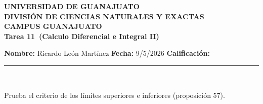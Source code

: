 \documentclass[12pt,a4paper]{article}
\newcommand{\alumno}{Ricardo León Martínez}
\newcommand{\materia}{Calculo Diferencial e Integral II}
\newcommand{\tarea}{Tarea 11}
\newcommand{\fecha}{9/5/2026}
\begin{document}
    \begin{center}
    {\large\textbf{UNIVERSIDAD DE GUANAJUATO}}\\[0.3cm]
    {\normalsize\textbf{DIVISIÓN DE CIENCIAS NATURALES Y EXACTAS}}\\
    {\normalsize\textbf{CAMPUS GUANAJUATO}}\\[1cm]

    {\Large\textbf{\tarea\ (\materia)}}\\[1cm]
    \end{center}

    \textbf{Nombre:} \alumno \hfill 
    \textbf{Fecha:} \fecha \hfill 
    \textbf{Calificación:} \rule{3cm}{0.4pt} \\[0.3cm]

    \begin{mdframed}[style=mdpinkbox,frametitle={Ejercicio 1}]
        Prueba el criterio de los límites superiores e inferiores (proposición 57).
    \end{mdframed}
\end{document}
